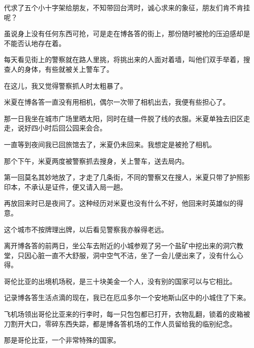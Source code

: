 \par 代求了五个小十字架给朋友，不知带回台湾时，诚心求来的象征，朋友们肯不肯挂呢？
\par 虽说身上没有任何东西可抢，可是走在博各答的街上，那份随时被抢的压迫感却是不能否认地存在着。
\par 每天看见街上的警察就在路人里挑，将挑出来的人面对着墙，叫他们双手举着，搜查人的身体，有些就被关上警车了。
\par 在这儿，我又觉得警察抓人时太粗暴了。
\par 米夏在博各答一直没有用相机，偶尔一次带了相机出去，我便有些担心了。
\par 那一日我坐在城市广场里晒太阳，同时在缝一件脱了线的衣服。米夏单独去旧区走走，说好四小时后回公园来会合。
\par 一直等到夜间我已回旅馆去了，米夏仍未回来。我想定是被抢了相机。
\par 那个下午，米夏两度被警察抓去搜身，关上警车，送去局内。
\par 第一回莫名其妙地放了，才走了几条街，不同的警察又在搜人，米夏只带了护照影印本，不承认是证件，便又请入局一趟。
\par 再放回来时已是夜间了。这种经历对米夏也没有什么不好，他回来时英雄似的得意。
\par 这个城市不按牌理出牌，以后看见警察我亦躲得老远。
\par 离开博各答的前两日，坐公车去附近的小城参观了另一个盐矿中挖出来的洞穴教堂，只因心脏一直不大舒服，洞中空气不洁，坐了一会儿便出来了，没有什么心得。
\par 哥伦比亚的出境机场税，是三十块美金一个人，没有别的国家可以与它相比。
\par 记录博各答生活点滴的现在，我已在厄瓜多尔一个安地斯山区中的小城住了下来。
\par 飞机场领出哥伦比亚来的行李时，每一只包包都已打开，衣物乱翻，锁着的皮箱被刀割开大口，零碎东西失踪，都是博各答机场的工作人员留给我的临别纪念。
\par 那是哥伦比亚，一个非常特殊的国家。



